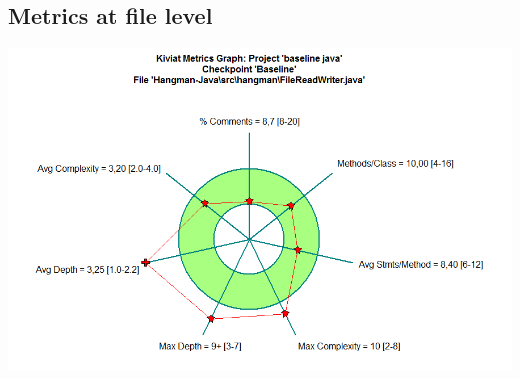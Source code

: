 \documentclass{article}
\begin{document}
\subsection{Metrics at file level}
\vspace {0.10 cm}
\begin{center}
\includegraphics[scale=0.4]{FileReadWriter-kiviat-before.png}
\end{center}
\end{document}
